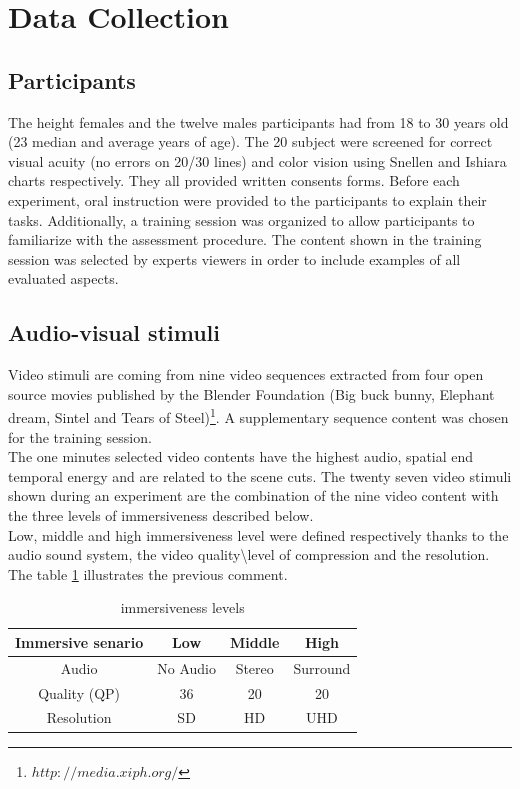 \section{Data Collection}

\subsection{Participants}
The height females and the twelve males participants had from 18 to 30 years old (23 median and average years of age). The 20 subject were screened for correct visual acuity (no errors on 20/30 lines) and color vision using Snellen and Ishiara charts respectively. They all provided written consents forms. Before each experiment, oral instruction were provided to the participants to explain their tasks. Additionally, a training session was organized to allow participants to familiarize with the assessment procedure. The content shown in the training session was selected by experts viewers in order to include examples of all evaluated aspects.

\subsection{Audio-visual stimuli}
Video stimuli are coming from nine video sequences extracted from four open source movies published by the Blender Foundation (Big buck bunny, Elephant dream, Sintel and Tears of Steel)\footnote{$http://media.xiph.org/$}. A supplementary sequence content was chosen for the training session.
\\The one minutes selected video contents have the highest audio, spatial end temporal energy and are related to the scene cuts.
The twenty seven video stimuli shown during an experiment are the combination of the nine video content with the three levels of immersiveness described below.
\\Low, middle and high immersiveness level were defined respectively thanks to the audio sound system, the video quality\textbackslash level of compression and the resolution.
The table \ref{IL} illustrates the previous comment.

\begin{table}[h]
\begin{tabular}{ |c || c | c | c | }
   \hline	
   Immersive senario 	& Low 			& Middle 		& High \\
   \hline	
   Audio 				& No Audio 		& Stereo		& Surround \\
   Quality (QP) 		& 36 			& 20			& 20 \\
   Resolution			& SD			& HD			& UHD\\
   \hline	
 \end{tabular}
 \caption{immersiveness levels}
 \label{IL}
 \end{table}

